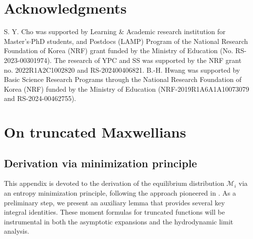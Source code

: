 \documentclass[10pt,reqno]{amsart}
\numberwithin{equation}{section}
\begin{document}
 \section*{Acknowledgments}

 S. Y. Cho was supported by Learning \& Academic research institution for Master's$\cdot$PhD students, and Postdocs (LAMP) Program of the National Research Foundation of Korea (NRF) grant funded by the Ministry of Education (No. RS-2023-00301974).  The research of YPC and SS was supported by the NRF grant no. 2022R1A2C1002820 and RS-202400406821. B.-H. Hwang was supported by Basic Science Research Programs through the National Research Foundation of Korea (NRF) funded by the Ministry of Education (NRF-2019R1A6A1A10073079 and RS-2024-00462755).

%
%
%                         
%
%
 

\appendix
\section{On truncated Maxwellians}\label{app_deri}
\subsection{Derivation via minimization principle}
This appendix is devoted to the derivation of the equilibrium distribution $\mathcal{M}_i$ via an entropy minimization principle, following the approach pioneered in \cite{B99}. As a preliminary step, we present an auxiliary lemma that provides several key integral identities. These moment formulas for truncated functions will be instrumental in both the asymptotic expansions and the hydrodynamic limit analysis.
\end{document}
